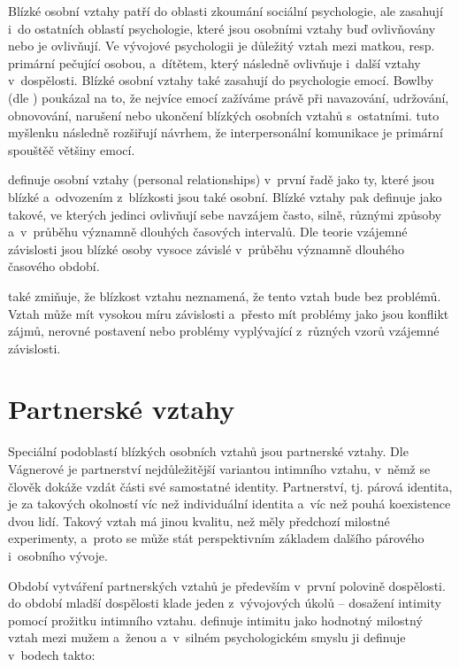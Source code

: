 \documentclass[a4paper, 12pt, notitlepage, oneside, numbers=noenddot]{report}
\begin{document}
Blízké osobní vztahy patří do oblasti zkoumání sociální psychologie,
ale zasahují i~do ostatních oblastí psychologie, které jsou osobními
vztahy buď ovlivňovány nebo je ovlivňují.  Ve vývojové psychologii je
důležitý vztah mezi matkou, resp. primární pečující osobou, a~dítětem,
který následně ovlivňuje i~další vztahy v~dospělosti.  Blízké osobní
vztahy také zasahují do psychologie emocí.  Bowlby (dle
\citealp{GuerreroAndersen2000}) poukázal na to, že nejvíce emocí
zažíváme právě při navazování, udržování, obnovování, narušení nebo
ukončení blízkých osobních vztahů s~ostatními.
\citet{GuerreroAndersen2000} tuto myšlenku následně rozšiřují návrhem,
že interpersonální komunikace je primární spouštěč většiny emocí.

\citet{Kelley1986} definuje osobní vztahy (personal relationships)
v~první řadě jako ty, které jsou blízké a~odvozením z~blízkosti jsou
také osobní.  Blízké vztahy pak definuje jako takové, ve kterých
jedinci ovlivňují sebe navzájem často, silně, různými způsoby
a~v~průběhu významně dlouhých časových intervalů.  Dle teorie vzájemné
závislosti jsou blízké osoby vysoce závislé v~průběhu významně
dlouhého časového období.

\citeauthor{Kelley1986} také zmiňuje, že blízkost vztahu neznamená, že
tento vztah bude bez problémů.  Vztah může mít vysokou míru závislosti
a~přesto mít problémy jako jsou konflikt zájmů, nerovné postavení nebo
problémy vyplývající z~různých vzorů vzájemné závislosti.

\section{Partnerské vztahy}
Speciální podoblastí blízkých osobních vztahů jsou partnerské vztahy.
Dle Vágnerové \citeyearpar{Vagnerova2007} je partnerství
nejdůležitější variantou intimního vztahu, v~němž se člověk dokáže
vzdát části své samostatné identity.  Partnerství, tj. párová
identita, je za takových okolností víc než individuální identita a~víc
než pouhá koexistence dvou lidí.  Takový vztah má jinou kvalitu, než
měly předchozí milostné experimenty, a~proto se může stát
perspektivním základem dalšího párového i~osobního vývoje.

Období vytváření partnerských vztahů je především v~první polovině
dospělosti.  \citet{Erikson1999} do období mladší dospělosti klade
jeden z~vývojových úkolů -- dosažení intimity pomocí prožitku
intimního vztahu.  \citet{Rican2006} definuje intimitu jako hodnotný
milostný vztah mezi mužem a~ženou a~v~silném psychologickém smyslu ji
definuje v~bodech takto:
\end{document}
